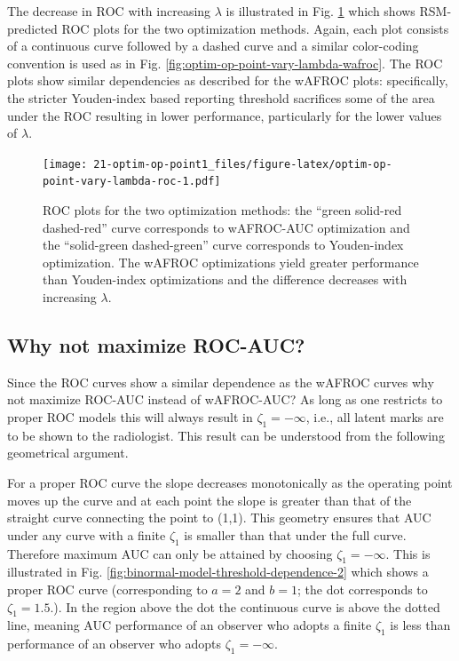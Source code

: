 \documentclass[
]{book}
\begin{document}
The decrease in \(\text{ROC}\) with increasing \(\lambda\) is illustrated in Fig. \ref{fig:optim-op-point-vary-lambda-roc} which shows RSM-predicted ROC plots for the two optimization methods. Again, each plot consists of a continuous curve followed by a dashed curve and a similar color-coding convention is used as in Fig. \ref{fig:optim-op-point-vary-lambda-wafroc}. The ROC plots show similar dependencies as described for the wAFROC plots: specifically, the stricter Youden-index based reporting threshold sacrifices some of the area under the ROC resulting in lower performance, particularly for the lower values of \(\lambda\).

\begin{figure}
\centering
\texttt{[image: 21-optim-op-point1\_files/figure-latex/optim-op-point-vary-lambda-roc-1.pdf]}
\caption{\label{fig:optim-op-point-vary-lambda-roc}ROC plots for the two optimization methods: the ``green solid-red dashed-red'' curve corresponds to wAFROC-AUC optimization and the ``solid-green dashed-green'' curve corresponds to Youden-index optimization. The wAFROC optimizations yield greater performance than Youden-index optimizations and the difference decreases with increasing \(\lambda\).}
\end{figure}

\hypertarget{why-not-maximize-roc-auc}{%
\subsection{Why not maximize ROC-AUC?}\label{why-not-maximize-roc-auc}}

Since the ROC curves show a similar dependence as the wAFROC curves why not maximize ROC-AUC instead of wAFROC-AUC? As long as one restricts to proper ROC models this will always result in \(\zeta_1 = -\infty\), i.e., all latent marks are to be shown to the radiologist. This result can be understood from the following geometrical argument.

For a proper ROC curve the slope decreases monotonically as the operating point moves up the curve and at each point the slope is greater than that of the straight curve connecting the point to (1,1). This geometry ensures that AUC under any curve with a finite \(\zeta_1\) is smaller than that under the full curve. Therefore maximum AUC can only be attained by choosing \(\zeta_1 = -\infty\). This is illustrated in Fig. \ref{fig:binormal-model-threshold-dependence-2} which shows a proper ROC curve (corresponding to \(a = 2\) and \(b = 1\); the dot corresponds to \(\zeta_1 = 1.5\).). In the region above the dot the continuous curve is above the dotted line, meaning AUC performance of an observer who adopts a finite \(\zeta_1\) is less than performance of an observer who adopts \(\zeta_1 = -\infty\).
\end{document}
